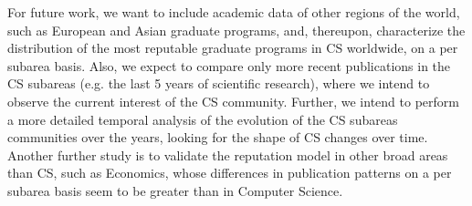 \documentclass[msc]{ppgccufmg}
\begin{document}
For future work, we want to include academic data of other regions of the world, such as European and Asian graduate programs, and, thereupon, characterize the distribution of the most reputable graduate programs in CS worldwide, on a per subarea basis. Also, we expect to compare only more recent publications in the CS subareas (e.g. the last 5 years of scientific research), where we intend to observe the current interest of the CS community. Further, we intend to perform a more detailed temporal analysis of the evolution of the CS subareas communities over the years, looking for the shape of CS changes over time. Another further study is to validate the reputation model in other broad areas than CS, such as Economics, whose differences in publication patterns on a per subarea basis seem to be greater than in Computer Science.


\end{document}
